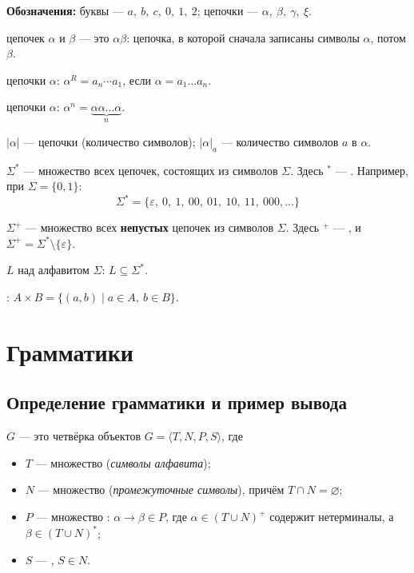 \documentclass[11pt,a4paper]{article}
\newcommand{\rul}{\rightarrow}
\begin{document}
\textbf{Обозначения:} буквы — $a,\ b,\ c,\ 0,\ 1,\ 2$; цепочки — $\alpha,\ \beta,\ \gamma,\ \xi$.

\begin{opr}
 цепочек $\alpha$ и $\beta$ — это $\alpha\beta$: цепочка, в которой сначала записаны символы $\alpha$, потом $\beta$.
\end{opr}
\begin{opr}
 цепочки $\alpha$: $\alpha^R=a_n\cdots a_1$, если $\alpha=a_1\dots a_n$.
\end{opr}
\begin{opr}
 цепочки $\alpha$: $\alpha^n=\underbrace{\alpha\alpha\dots\alpha}_{n}$.
\end{opr}
\begin{opr}
$|\alpha|$ —  цепочки (количество символов); $|\alpha|_a$ — количество символов $a$ в $\alpha$.
\end{opr}
\begin{opr}
$\Sigma^*$ — множество всех цепочек, состоящих из символов $\Sigma$. Здесь $^*$ — .
Например, при $\Sigma=\{0,1\}$:
\[
\Sigma^*=\{\varepsilon,\ 0,\ 1,\ 00,\ 01,\ 10,\ 11,\ 000,\dots\}
\]
\end{opr}
\begin{opr}
$\Sigma^+$ — множество всех \textbf{непустых} цепочек из символов $\Sigma$. Здесь $^+$ — , и $\Sigma^+=\Sigma^*\setminus\{\varepsilon\}$.
\end{opr}
\begin{opr}
 $L$ над алфавитом $\Sigma$: $L\subseteq\Sigma^*$.
\end{opr}
\begin{opr}
: $A\times B=\{(a,b)\mid a\in A,\ b\in B\}$.
\end{opr}

\section{Грамматики}

\subsection{Определение грамматики и пример вывода}

\begin{opr}
 $G$ — это четвёрка объектов $G=\langle T,N,P,S\rangle$, где
\begin{itemize}
\item $T$ — множество  (\emph{символы алфавита});
\item $N$ — множество  (\emph{промежуточные символы}), причём $T\cap N=\varnothing$;
\item $P$ — множество : $\alpha\rul\beta\in P$, где $\alpha\in(T\cup N)^+$ содержит нетерминалы, а $\beta\in(T\cup N)^*$;
\item $S$ — , $S\in N$.
\end{itemize}
\end{opr}
\end{document}
